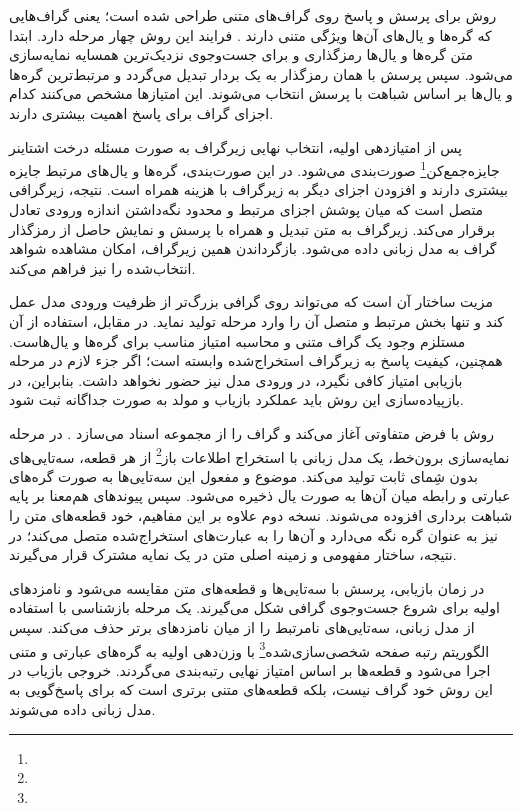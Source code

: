 روش  برای پرسش و پاسخ روی گراف‌های متنی طراحی شده است؛ یعنی گراف‌هایی که گره‌ها و یال‌های آن‌ها ویژگی متنی دارند \cite{he2024gretriever}. فرایند این روش چهار مرحله دارد. ابتدا متن گره‌ها و یال‌ها رمزگذاری و برای جست‌وجوی نزدیک‌ترین همسایه نمایه‌سازی می‌شود. سپس پرسش با همان رمزگذار به یک بردار تبدیل می‌گردد و مرتبط‌ترین گره‌ها و یال‌ها بر اساس شباهت با پرسش انتخاب می‌شوند. این امتیازها مشخص می‌کنند کدام اجزای گراف برای پاسخ اهمیت بیشتری دارند.

پس از امتیازدهی اولیه، انتخاب نهایی زیرگراف به صورت مسئله درخت اشتاینر جایزه‌جمع‌کن\footnote{} صورت‌بندی می‌شود. در این صورت‌بندی، گره‌ها و یال‌های مرتبط جایزه بیشتری دارند و افزودن اجزای دیگر به زیرگراف با هزینه همراه است. نتیجه، زیرگرافی متصل است که میان پوشش اجزای مرتبط و محدود نگه‌داشتن اندازه ورودی تعادل برقرار می‌کند. زیرگراف به متن تبدیل و همراه با پرسش و نمایش حاصل از رمزگذار گراف به مدل زبانی داده می‌شود. بازگرداندن همین زیرگراف، امکان مشاهده شواهد انتخاب‌شده را نیز فراهم می‌کند.

مزیت ساختار  آن است که می‌تواند روی گرافی بزرگ‌تر از ظرفیت ورودی مدل عمل کند و تنها بخش مرتبط و متصل آن را وارد مرحله تولید نماید. در مقابل، استفاده از آن مستلزم وجود یک گراف متنی و محاسبه امتیاز مناسب برای گره‌ها و یال‌هاست. همچنین، کیفیت پاسخ به زیرگراف استخراج‌شده وابسته است؛ اگر جزء لازم در مرحله بازیابی امتیاز کافی نگیرد، در ورودی مدل نیز حضور نخواهد داشت. بنابراین، در بازپیاده‌سازی این روش باید عملکرد بازیاب و مولد به صورت جداگانه ثبت شود.

روش  با فرض متفاوتی آغاز می‌کند و گراف را از مجموعه اسناد می‌سازد \cite{gutierrez2025hipporag2}. در مرحله نمایه‌سازی برون‌خط، یک مدل زبانی با استخراج اطلاعات باز\footnote{} از هر قطعه، سه‌تایی‌های بدون شِمای ثابت تولید می‌کند. موضوع و مفعول این سه‌تایی‌ها به صورت گره‌های عبارتی و رابطه میان آن‌ها به صورت یال ذخیره می‌شود. سپس پیوندهای هم‌معنا بر پایه شباهت برداری افزوده می‌شوند. نسخه دوم  علاوه بر این مفاهیم، خود قطعه‌های متن را نیز به عنوان گره نگه می‌دارد و آن‌ها را به عبارت‌های استخراج‌شده متصل می‌کند؛ در نتیجه، ساختار مفهومی و زمینه اصلی متن در یک نمایه مشترک قرار می‌گیرند.

در زمان بازیابی، پرسش با سه‌تایی‌ها و قطعه‌های متن مقایسه می‌شود و نامزدهای اولیه برای شروع جست‌وجوی گرافی شکل می‌گیرند. یک مرحله بازشناسی با استفاده از مدل زبانی، سه‌تایی‌های نامرتبط را از میان نامزدهای برتر حذف می‌کند. سپس الگوریتم رتبه صفحه شخصی‌سازی‌شده\footnote{} با وزن‌دهی اولیه به گره‌های عبارتی و متنی اجرا می‌شود و قطعه‌ها بر اساس امتیاز نهایی رتبه‌بندی می‌گردند. خروجی بازیاب در این روش خود گراف نیست، بلکه قطعه‌های متنی برتری است که برای پاسخ‌گویی به مدل زبانی داده می‌شوند.

